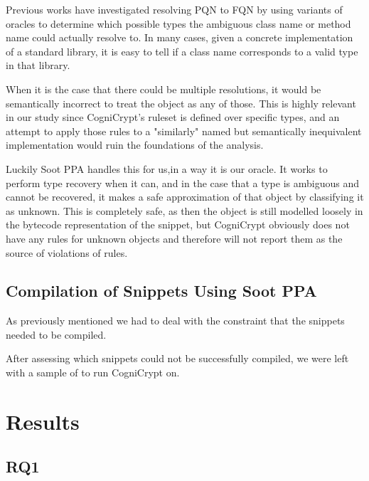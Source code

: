\documentclass[10pt, conference]{IEEEtran}
\begin{document}
Previous works \cite{} have investigated resolving PQN to FQN by using variants of oracles to determine which possible types the ambiguous class name or method name could actually resolve to. In many cases, given a concrete implementation of a standard library, it is easy to tell if a class name corresponds to a valid type in that library. 

When it is the case that there could be multiple resolutions, it would be semantically incorrect to treat the object as any of those. This is highly relevant in our study since CogniCrypt's ruleset is defined over specific types, and an attempt to apply those rules to a "similarly" named but semantically inequivalent implementation would ruin the foundations of the analysis.

Luckily Soot PPA handles this for us,in a way it is our oracle. It works to perform type recovery when it can, and in the case that a type is ambiguous and cannot be recovered, it makes a safe approximation of that object by classifying it as unknown. This is completely safe, as then the object is still modelled loosely in the bytecode representation of the snippet, but CogniCrypt obviously does not have any rules for unknown objects and therefore will not report them as the source of violations of rules.

\subsection{Compilation of Snippets Using Soot PPA}

As previously mentioned we had to deal with the constraint that the snippets needed to be compiled.

After assessing which snippets could not be successfully compiled, we were left with a sample of to run CogniCrypt on. 

\section{Results}

\subsection{RQ1}
\end{document}

